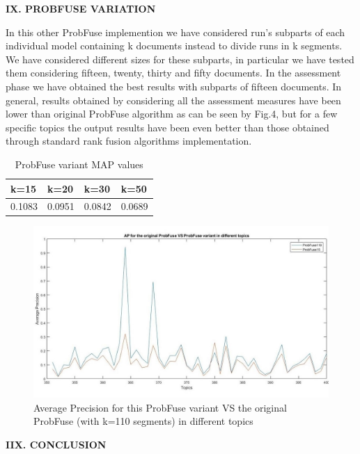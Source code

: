 \documentclass[12pt,journal]{IEEEtran}
\begin{document}
\textbf{IX.	PROBFUSE VARIATION}

In this other ProbFuse implemention we have considered run's subparts of each individual model containing k documents instead to divide runs in k segments. We have considered different sizes for these subparts, in particular we have tested them considering fifteen, twenty, thirty and fifty documents. In the assessment phase we have obtained the best results with subparts of fifteen documents. In general, results obtained by considering all the assessment measures have been lower than original ProbFuse algorithm as can be seen by Fig.4, but for a few specific topics the output results have been even better than those obtained through standard rank fusion algorithms implementation. 

\begin{table}[h!]
\centering
\caption{ProbFuse variant MAP values}
\begin{tabular}{|l|l|l|l|}
\hline
k=15 & k=20 & k=30 & k=50 \\ \hline
0.1083 & 0.0951 & 0.0842 & 0.0689  \\ \hline
\end{tabular}
\end{table}

\begin{figure}
\includegraphics[scale=0.6]{plot3}
\caption{Average Precision for this ProbFuse variant VS the original ProbFuse (with k=110 segments) in different topics}
\label{Average Precision for this ProbFuse variant VS the original ProbFuse (with k=110 segments) in different topics}
\end{figure}



\textbf{IIX. CONCLUSION}
\end{document}
